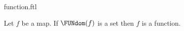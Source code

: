 \documentclass{stex}
\begin{document}
\begin{smodule}{function.ftl}

\begin{axiom}[forthel,title=Function Axiom,id=FOUNDATIONS_10_7781693549182976]
  Let $f$ be a map.
  If $\FUNdom(f)$ is a set then $f$ is a function.
\end{axiom}
\end{smodule}
\end{document}
